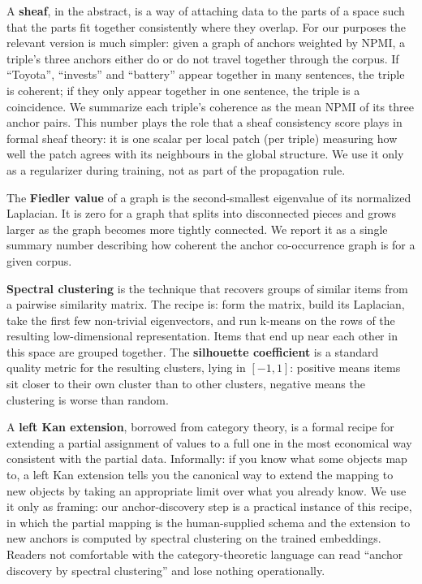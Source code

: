\documentclass[11pt,a4paper]{article}
\begin{document}
A \textbf{sheaf}, in the abstract, is a way of attaching data to
the parts of a space such that the parts fit together consistently
where they overlap. For our purposes the relevant version is much
simpler: given a graph of anchors weighted by NPMI, a triple's
three anchors either do or do not travel together through the
corpus. If ``Toyota'', ``invests'' and ``battery'' appear together
in many sentences, the triple is coherent; if they only appear
together in one sentence, the triple is a coincidence. We summarize
each triple's coherence as the mean NPMI of its three anchor pairs.
This number plays the role that a sheaf consistency score plays in
formal sheaf theory: it is one scalar per local patch (per triple)
measuring how well the patch agrees with its neighbours in the
global structure. We use it only as a regularizer during training,
not as part of the propagation rule.

The \textbf{Fiedler value} of a graph is the second-smallest
eigenvalue of its normalized Laplacian. It is zero for a graph
that splits into disconnected pieces and grows larger as the
graph becomes more tightly connected. We report it as a single
summary number describing how coherent the anchor co-occurrence
graph is for a given corpus.

\textbf{Spectral clustering} is the technique that recovers
groups of similar items from a pairwise similarity matrix. The
recipe is: form the matrix, build its Laplacian, take the first
few non-trivial eigenvectors, and run k-means on the rows of the
resulting low-dimensional representation. Items that end up near
each other in this space are grouped together. The
\textbf{silhouette coefficient} is a standard quality metric for
the resulting clusters, lying in $[-1, 1]$: positive means items
sit closer to their own cluster than to other clusters, negative
means the clustering is worse than random.

A \textbf{left Kan extension}, borrowed from category theory, is
a formal recipe for extending a partial assignment of values to a
full one in the most economical way consistent with the partial
data. Informally: if you know what some objects map to, a left
Kan extension tells you the canonical way to extend the mapping
to new objects by taking an appropriate limit over what you
already know. We use it only as framing: our anchor-discovery
step is a practical instance of this recipe, in which the partial
mapping is the human-supplied schema and the extension to new
anchors is computed by spectral clustering on the trained
embeddings. Readers not comfortable with the category-theoretic
language can read ``anchor discovery by spectral clustering'' and
lose nothing operationally.
\end{document}

